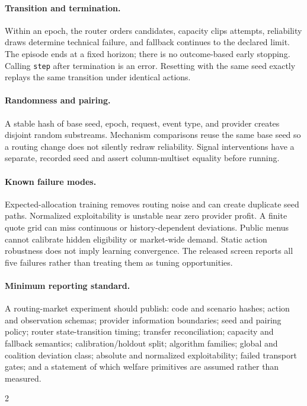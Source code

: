 \documentclass[10pt]{article}
\newcommand{\1}{\mathbf 1}
\begin{document}
\paragraph{Transition and termination.}
Within an epoch, the router orders candidates, capacity clips attempts,
reliability draws determine technical failure, and fallback continues to the
declared limit.  The episode ends at a fixed horizon; there is no outcome-based
early stopping.  Calling \texttt{step} after termination is an error.  Resetting
with the same seed exactly replays the same transition under identical actions.

\paragraph{Randomness and pairing.}
A stable hash of base seed, epoch, request, event type, and provider creates
disjoint random substreams.  Mechanism comparisons reuse the same base seed so a
routing change does not silently redraw reliability.  Signal interventions have
a separate, recorded seed and assert column-multiset equality before running.

\paragraph{Known failure modes.}
Expected-allocation training removes routing noise and can create duplicate seed
paths.  Normalized exploitability is unstable near zero provider profit.  A
finite quote grid can miss continuous or history-dependent deviations.  Public
menus cannot calibrate hidden eligibility or market-wide demand.  Static action
robustness does not imply learning convergence.  The released screen reports all
five failures rather than treating them as tuning opportunities.

\paragraph{Minimum reporting standard.}
A routing-market experiment should publish: code and scenario hashes; action and
observation schemas; provider information boundaries; seed and pairing policy;
router state-transition timing; transfer reconciliation; capacity and fallback
semantics; calibration/holdout split; algorithm families; global and coalition
deviation class; absolute and normalized exploitability; failed transport gates;
and a statement of which welfare primitives are assumed rather than measured.

\begin{multicols}{2}
\small


\end{multicols}
\end{document}
